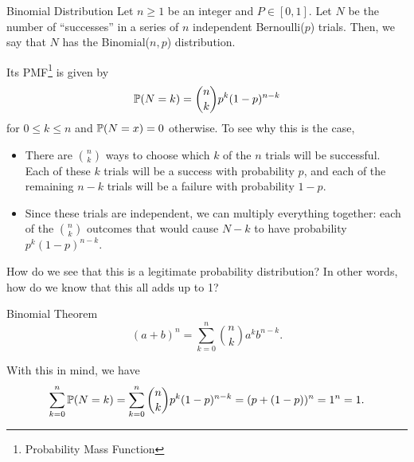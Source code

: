 \begin{definition}{Binomial Distribution}{}
    Let $n \geq 1$ be an integer and $P \in [0, 1]$. Let $N$ be the number of ``successes'' in a series of $n$ independent Bernoulli($p$) trials. Then, we say that $N$ has the Binomial($n, p$) distribution.
\end{definition}
Its PMF\footnote{Probability Mass Function} is given by 
\[\mathbb{P}(N = k) = \binom{n}{k}p^k (1 - p)^{n - k}\]
for $0 \leq k \leq n$ and $\mathbb{P}(N = x) = 0$ otherwise. To see why this is the case,
\begin{itemize}
    \item There are $\binom{n}{k}$ ways to choose which $k$ of the $n$ trials will be successful. Each of these $k$ trials will be a success with probability $p$, and each of the remaining $n - k$ trials will be a failure with probability $1 - p$. 
    \item Since these trials are independent, we can multiply everything together: each of the $\binom{n}{k}$ outcomes that would cause $N - k$ to have probability $p^k (1 - p)^{n - k}$. 
\end{itemize}
How do we see that this is a legitimate probability distribution? In other words, how do we know that this all adds up to 1? 
\begin{theorem}{Binomial Theorem}{}
    \[(a + b)^n = \sum_{k = 0}^{n} \binom{n}{k} a^k b^{n - k}.\]
\end{theorem}
With this in mind, we have 
\[\sum_{k = 0}^{n} \mathbb{P}(N = k) = \sum_{k = 0}^{n} \binom{n}{k} p^k (1 - p)^{n - k} = (p + (1 - p))^n = 1^n = 1.\]
